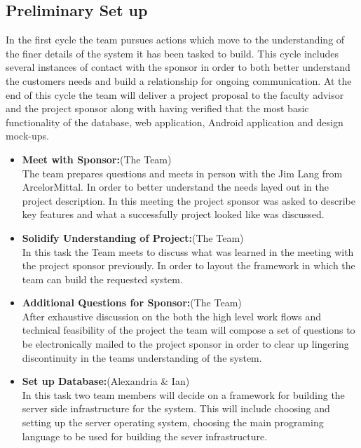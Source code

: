 \documentclass[Letter,11pt]{article}
\begin{document}
		
	\subsection{Preliminary Set up}\label{cyc1}
		In the first cycle the team pursues actions which move to the understanding of the finer details of the system it has been tasked to build. This cycle includes several instances of contact with the sponsor in order to both better understand the customers needs and build a relationship for ongoing communication. At the end of this cycle the team will deliver a project proposal to the faculty advisor and the project sponsor along with having verified that the most basic functionality of the database, web application, Android application and design mock-ups. 
		
		\begin{itemize}
			\item\textbf{Meet with Sponsor:}(The Team)\\
			The team prepares questions and meets in person with the Jim Lang from ArcelorMittal. In order to better understand the needs layed out in the project description. In this meeting the project sponsor was asked to describe key features and  what a successfully project looked like was discussed.
			
			\item \textbf{Solidify Understanding of Project:}(The Team)\\
			In this task the Team meets to discuss what was learned in the meeting with the project sponsor previously. In order to layout the framework in which the team can build the requested system.
			
			\item\textbf{Additional Questions for Sponsor:}(The Team)\\
			After exhaustive discussion on the both the high level work flows and technical feasibility of the project the team will compose a set of questions to be electronically mailed to the project sponsor in order to clear up lingering discontinuity in the teams understanding of the system.
			
			\item\textbf{Set up Database:}(Alexandria \& Ian)\\
			In this task two team members will decide on a framework for building the server side infrastructure for the system. This will include choosing and setting up the server operating system, choosing the main programing language to be used for building the sever infrastructure.
			

\end{itemize}
\end{document}
